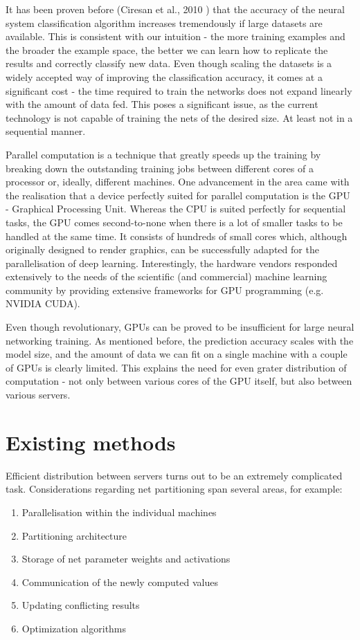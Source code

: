 \documentclass[a4paper, 12pt]{article}
\numberwithin{equation}{section}
\begin{document}
	It has been proven before (Ciresan et al., 2010 \cite{ciresan2010deep}) that the accuracy of the neural system classification algorithm increases tremendously if large datasets are available. This is consistent with our intuition - the more training examples and the broader the example space, the better we can learn how to replicate the results and correctly classify new data. Even though scaling the datasets is a widely accepted way of improving the classification accuracy, it comes at a significant cost - the time required to train the networks does not expand linearly with the amount of data fed. This poses a significant issue, as the current technology is not capable of training the nets of the desired size. At least not in a sequential manner.

	Parallel computation is a technique that greatly speeds up the training by breaking down the outstanding training jobs between different cores of a processor or, ideally, different machines. One advancement in the area came with the realisation that a device perfectly suited for parallel computation is the GPU - Graphical Processing Unit. Whereas the CPU is suited perfectly for sequential tasks, the GPU comes second-to-none when there is a lot of smaller tasks to be handled at the same time. It consists of hundreds of small cores which, although originally designed to render graphics, can be successfully adapted for the parallelisation of deep learning. Interestingly, the hardware vendors responded extensively to the needs of the scientific (and commercial) machine learning community by providing extensive frameworks for GPU programming (e.g. NVIDIA CUDA).

	Even though revolutionary, GPUs can be proved to be insufficient for large neural networking training. As mentioned before, the prediction accuracy scales with the model size, and the amount of data we can fit on a single machine with a couple of GPUs is clearly limited. This explains the need for even grater distribution of computation - not only between various cores of the GPU itself, but also between various servers.

	\section{Existing methods}
	\label{breakingitdown}

	Efficient distribution between servers turns out to be an extremely complicated task. Considerations regarding net partitioning span several areas, for example:
	\begin{enumerate}
		\item Parallelisation within the individual machines
		\item Partitioning architecture
		\item Storage of net parameter weights and activations
		\item Communication of the newly computed values
		\item Updating conflicting results
		\item Optimization algorithms
	\end{enumerate}
\end{document}
